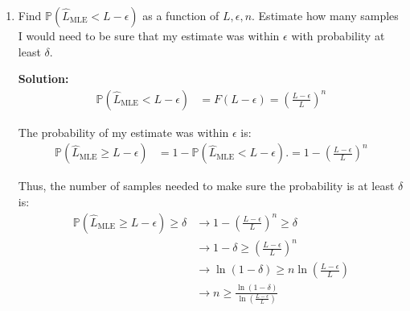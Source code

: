 \documentclass[letter, 12pt]{article}
\begin{document}
\begin{enumerate}[wide = 0pt, label = \arabic*)]
		\item {Find $ \mathbb{P}(\hat{L}_{\text{MLE}} < L - \epsilon) $ as a function of $ L, \epsilon, n $. Estimate how many samples I would need to be sure that my estimate was within $ \epsilon $ with probability at least $ \delta $.}
		\par{\textbf{Solution:}}
		\begin{align*}
			\mathbb{P}(\hat{L}_{\text{MLE}} < L - \epsilon) &= F(L - \epsilon) 
			= (\frac{L - \epsilon}{L})^n 
		\end{align*}
		\par{The probability of my estimate was within $ \epsilon $ is:}
		\begin{align*}
			\mathbb{P}(\hat{L}_{\text{MLE}} \ge L - \epsilon) &= 1 - \mathbb{P}(\hat{L}_{\text{MLE}} < L - \epsilon). = 1 - (\frac{L - \epsilon}{L})^n 
		\end{align*}
		\par{Thus, the number of samples needed to make sure the probability is at least $ \delta $ is:}
		\begin{align*}
			\mathbb{P}(\hat{L}_{\text{MLE}} \ge L - \epsilon) \ge \delta &\rightarrow 1 - (\frac{L - \epsilon}{L})^n \ge \delta \\
			&\rightarrow 1 - \delta \ge (\frac{L - \epsilon}{L})^n \\
			&\rightarrow \ln(1 - \delta) \ge n \ln(\frac{L - \epsilon}{L}) \\
			&\rightarrow n \ge \frac{\ln(1 - \delta)}{\ln(\frac{L - \epsilon}{L})}
		\end{align*}
		

\end{enumerate}
\end{document}

